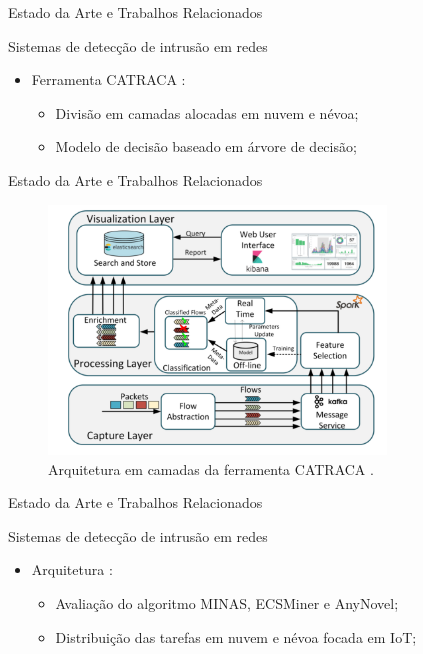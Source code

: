 \documentclass[aspectratio=43,10pt]{beamer}
\newcommand{\nota}[1]{\hspace*{-0.5cm}\textit{{\color[rgb]{1,0,0}Nota: #1}}}
\begin{document}
\begin{frame}[fragile]{Estado da Arte e Trabalhos Relacionados}
\begin{alertblock}{Sistemas de detecção de intrusão em redes}
  \begin{itemize}
    \item Ferramenta CATRACA \cite{Lopez2018}:
    \begin{itemize}
      \item Divisão em camadas alocadas em nuvem e névoa;
      \item Modelo de decisão baseado em árvore de decisão;
    \end{itemize}
  \end{itemize}
\end{alertblock}
\end{frame}

\begin{frame}[fragile]{Estado da Arte e Trabalhos Relacionados}
\begin{figure}[ht]
  \centering
  \includegraphics[width=0.8\textwidth]{figuras/catraca-arch.png}
  \caption{Arquitetura em camadas da ferramenta CATRACA \cite{Lopez2018}.}
  \label{fig:catraca}
\end{figure}
\end{frame}


\begin{frame}[fragile]{Estado da Arte e Trabalhos Relacionados}
\begin{alertblock}{Sistemas de detecção de intrusão em redes}
  \begin{itemize}
    \item Arquitetura \idsiot \cite{Cassales2019a}:
    \begin{itemize}
      \item Avaliação do algoritmo MINAS, ECSMiner e AnyNovel;
      \item Distribuição das tarefas em nuvem e névoa focada em IoT;
    \end{itemize}
  \end{itemize}
\end{alertblock}
\end{frame}
\end{document}
